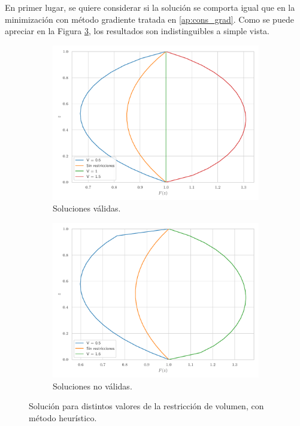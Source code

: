 En primer lugar, se quiere considerar si la solución se comporta igual que en la minimización con método gradiente tratada en \ref{ap:cons_grad}. Como se puede apreciar en la Figura \ref{fig:vol_variacion_de}, los resultados son indistinguibles a simple vista. 

\begin{figure}[h]
    \centering
    \begin{subfigure}[b]{0.45\textwidth}
        \centering
        \includegraphics[width=\textwidth]{Figures/01/vol_inic_de.pdf}
        \caption{Soluciones válidas.}
        \label{fig:vol_inic_de}
    \end{subfigure}
    \hfill
    \begin{subfigure}[b]{0.45\textwidth}
        \centering
        \includegraphics[width=\textwidth]{Figures/01/vol_no_sol_de.pdf}
        \caption{Soluciones no válidas.}
        \label{fig:vol_no_sol_de}
    \end{subfigure}
    \caption{Solución para distintos valores de la restricción de volumen, con método heurístico.}
    \label{fig:vol_variacion_de}
\end{figure}

